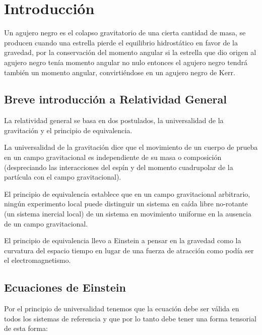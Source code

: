 \documentclass{article}
\begin{document}
\tableofcontents

\begin{abstract}
 
\end{abstract}
\renewcommand{\abstractname}{Resumo}
\begin{abstract}
 
\end{abstract}
\renewcommand{\abstractname}{Abstract}
\begin{abstract}
 
\end{abstract}

\section{Introducción}
Un agujero negro es el colapso gravitatorio de una cierta cantidad de masa, se producen cuando una estrella pierde el equilibrio hidrostático en favor de la gravedad, por la conservación del momento angular si la estrella que dio origen al agujero negro tenía momento angular no nulo entonces el agujero negro tendrá también un momento angular, convirtiéndose en un agujero negro de Kerr.

\subsection{Breve introducción a Relatividad General}
La relatividad general se basa en dos postulados, la universalidad de la gravitación y el principio de equivalencia\cite{sarbach2011relatividad}. 

La universalidad de la gravitación dice que el movimiento de un cuerpo de prueba en un campo gravitacional es independiente de su masa o composición (despreciando las interacciones del espín y del momento cuadrupolar de la partícula con el campo gravitacional).\cite{sarbach2011relatividad}

El principio de equivalencia establece que en un campo gravitacional arbitrario, ningún experimento local puede distinguir un sistema en caída libre no-rotante (un sistema inercial local) de un sistema en movimiento uniforme en la ausencia de un campo gravitacional.\cite{sarbach2011relatividad}

El principio de equivalencia llevo a Einstein a pensar en la gravedad como la curvatura del espacio tiempo en lugar de una fuerza de atracción como podía ser el electromagnetismo.

\subsection{Ecuaciones de Einstein}
Por el principio de universalidad tenemos que la ecuación debe ser válida en todos los sistemas de referencia y que por lo tanto debe tener una forma tensorial de esta forma:\cite{janssen2013teoria}
\end{document}
